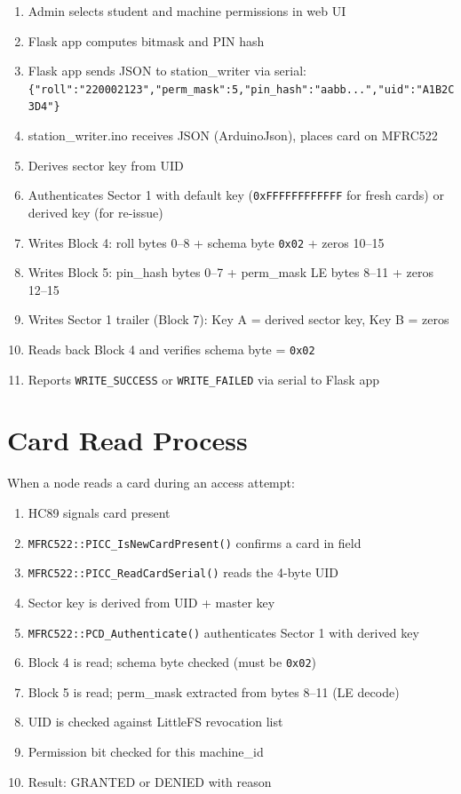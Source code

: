 \begin{enumerate}[leftmargin=1.5em]
    \item Admin selects student and machine permissions in web UI
    \item Flask app computes bitmask and PIN hash
    \item Flask app sends JSON to station\_writer via serial: \\
          \texttt{\{"roll":"220002123","perm\_mask":5,"pin\_hash":"aabb...","uid":"A1B2C3D4"\}}
    \item station\_writer.ino receives JSON (ArduinoJson), places card on MFRC522
    \item Derives sector key from UID
    \item Authenticates Sector 1 with default key (\texttt{0xFFFFFFFFFFFF} for fresh cards) or derived key (for re-issue)
    \item Writes Block 4: roll bytes 0--8 + schema byte \texttt{0x02} + zeros 10--15
    \item Writes Block 5: pin\_hash bytes 0--7 + perm\_mask LE bytes 8--11 + zeros 12--15
    \item Writes Sector 1 trailer (Block 7): Key A = derived sector key, Key B = zeros
    \item Reads back Block 4 and verifies schema byte = \texttt{0x02}
    \item Reports \texttt{WRITE\_SUCCESS} or \texttt{WRITE\_FAILED} via serial to Flask app
\end{enumerate}

\section{Card Read Process}

When a node reads a card during an access attempt:

\begin{enumerate}[leftmargin=1.5em]
    \item HC89 signals card present
    \item \texttt{MFRC522::PICC\_IsNewCardPresent()} confirms a card in field
    \item \texttt{MFRC522::PICC\_ReadCardSerial()} reads the 4-byte UID
    \item Sector key is derived from UID + master key
    \item \texttt{MFRC522::PCD\_Authenticate()} authenticates Sector 1 with derived key
    \item Block 4 is read; schema byte checked (must be \texttt{0x02})
    \item Block 5 is read; perm\_mask extracted from bytes 8--11 (LE decode)
    \item UID is checked against LittleFS revocation list
    \item Permission bit checked for this machine\_id
    \item Result: GRANTED or DENIED with reason
\end{enumerate}
